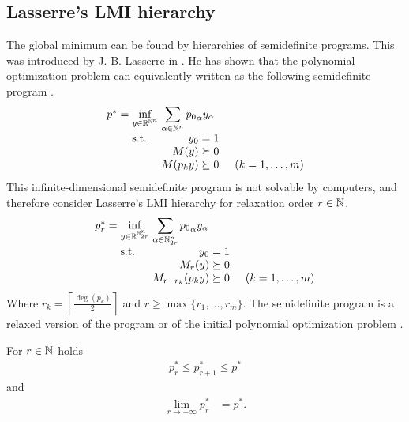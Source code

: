 \subsection{Lasserre's LMI hierarchy}
The global minimum can be found by hierarchies of semidefinite programs. This was introduced by J. B. Lasserre in \cite{Lasserre}. He has shown that the polynomial optimization problem  can equivalently written as the following semidefinite program .
\begin{align}
  \arraycolsep=1.4pt
  \begin{array}{rclrcl@{\hskip0.5cm}l}
    p^* &=& \displaystyle \inf_{y\in\R^{\N^n}} & \multicolumn{3}{l}{\displaystyle \sum_{\alpha\in\N^n}{p_0}_\alpha y_\alpha} \\
    && \text{s.t.} & y_0 &=& 1\\
    &&& M(y) &\succeq& 0\\
    &&& M(p_ky) &\succeq& 0 & (k = 1,\ldots,m)
  \end{array}\labeleq{POP:opt:SDP}
\end{align}
This infinite-dimensional semidefinite program is not solvable by computers, and therefore consider Lasserre's LMI hierarchy  for relaxation order $r\in\mathbb{N}$.
\begin{align}
  \arraycolsep=1.4pt
  \begin{array}{rclrcl@{\hskip0.5cm}l}
    p_r^* &=& \displaystyle \inf_{y\in\R^{\N^n_{2r}}} & \multicolumn{2}{l}{\displaystyle \sum_{\alpha\in\N^n_{2r}}{p_0}_\alpha y_\alpha} \\
    && \text{s.t.} & y_0 &=& 1\\
    &&& M_r(y) &\succeq& 0\\
    &&& M_{r-r_k}(p_ky) &\succeq& 0 & (k = 1,\ldots,m)
  \end{array}\labeleq{POP:opt:SDPr}
\end{align}
Where $r_k = \left\lceil\frac{\deg(p_k)}{2}\right\rceil$ and $r\geq\max\{r_1, \ldots, r_m\}$.
The semidefinite program  is a relaxed version of the program  or of the initial polynomial optimization problem .

\begin{theorem}
  For $r\in\mathbb{N}$ holds
  \begin{align}
    p^*_r \leq p^*_{r+1} \leq p^*
  \end{align}
  and
  \begin{align}
    \lim_{r\rightarrow+\infty}p^*_r &= p^*.
  \end{align}
\end{theorem}

